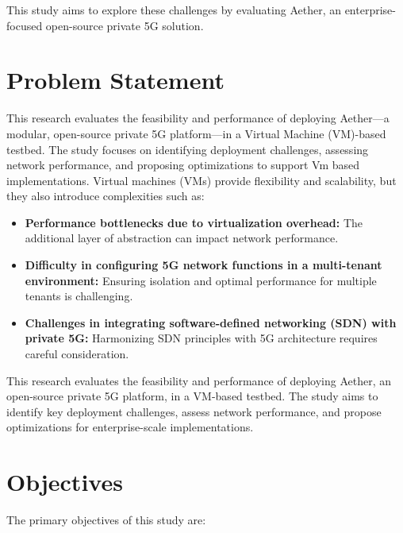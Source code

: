 This study aims to explore these challenges by evaluating Aether, an enterprise-focused open-source private 5G solution.

\section{Problem Statement}

This research evaluates the feasibility and performance of deploying Aether—a modular, open-source private 5G platform—in a Virtual Machine (VM)-based testbed. The study focuses on identifying deployment challenges, assessing network performance, and proposing optimizations to support Vm based implementations. Virtual machines (VMs) provide flexibility and scalability, but they also introduce complexities such as:

\begin{itemize}
    \item \textbf{Performance bottlenecks due to virtualization overhead:} The additional layer of abstraction can impact network performance.
    \item \textbf{Difficulty in configuring 5G network functions in a multi-tenant environment:} Ensuring isolation and optimal performance for multiple tenants is challenging.
    \item \textbf{Challenges in integrating software-defined networking (SDN) with private 5G:} Harmonizing SDN principles with 5G architecture requires careful consideration.
\end{itemize}

This research evaluates the feasibility and performance of deploying Aether, an open-source private 5G platform, in a VM-based testbed. The study aims to identify key deployment challenges, assess network performance, and propose optimizations for enterprise-scale implementations.
\clearpage
\section{Objectives}

The primary objectives of this study are:


